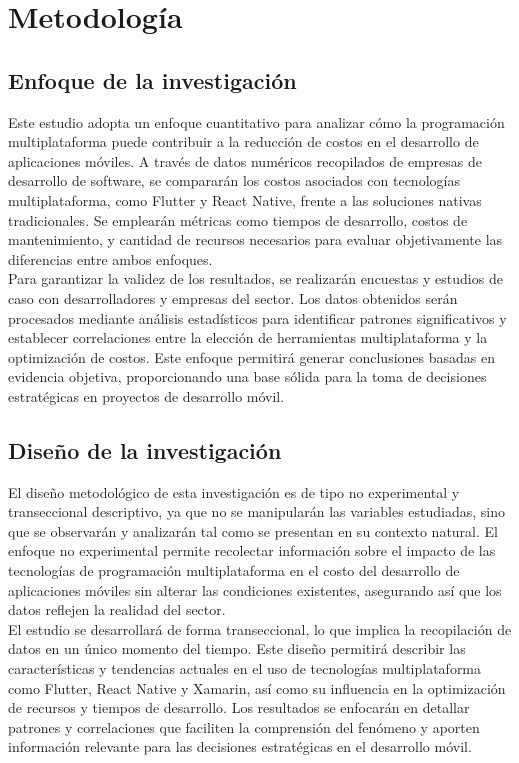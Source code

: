 \newpage
\section{Metodología}
\subsection{Enfoque de la investigación}
Este estudio adopta un enfoque cuantitativo para analizar cómo la programación
multiplataforma puede contribuir a la reducción de costos en el desarrollo de
aplicaciones móviles. A través de datos numéricos recopilados de empresas de
desarrollo de software, se compararán los costos asociados con tecnologías
multiplataforma, como Flutter y React Native, frente a las soluciones
nativas tradicionales. Se emplearán métricas como tiempos de desarrollo,
costos de mantenimiento, y cantidad de recursos necesarios para evaluar
objetivamente las diferencias entre ambos enfoques.\\

Para garantizar la validez de los resultados, se realizarán encuestas y estudios
de caso con desarrolladores y empresas del sector. Los datos obtenidos serán
procesados mediante análisis estadísticos para identificar patrones significativos
y establecer correlaciones entre la elección de herramientas multiplataforma
y la optimización de costos. Este enfoque permitirá generar conclusiones
basadas en evidencia objetiva, proporcionando una base sólida para la
toma de decisiones estratégicas en proyectos de desarrollo móvil.

\subsection{Diseño de la investigación}
El diseño metodológico de esta investigación es de tipo no experimental y
transeccional descriptivo, ya que no se manipularán las variables estudiadas,
sino que se observarán y analizarán tal como se presentan en su contexto
natural. El enfoque no experimental permite recolectar información sobre
el impacto de las tecnologías de programación multiplataforma en el
costo del desarrollo de aplicaciones móviles sin alterar las condiciones
existentes, asegurando así que los datos reflejen la realidad del sector.\\

El estudio se desarrollará de forma transeccional, lo que implica la
recopilación de datos en un único momento del tiempo. Este diseño permitirá
describir las características y tendencias actuales en el uso de
tecnologías multiplataforma como Flutter, React Native y Xamarin, así
como su influencia en la optimización de recursos y tiempos de desarrollo.
Los resultados se enfocarán en detallar patrones y correlaciones que
faciliten la comprensión del fenómeno y aporten información relevante
para las decisiones estratégicas en el desarrollo móvil.

